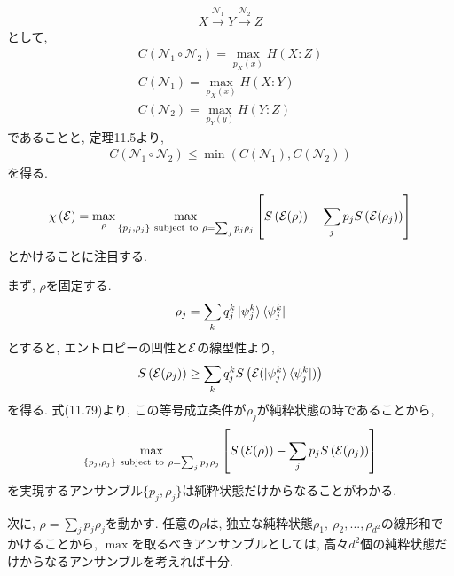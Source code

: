 \begin{ex}
    \label{ex12.10}
    \begin{align*}
        X \xrightarrow{\mathscr{N}_1} Y \xrightarrow{\mathscr{N}_2} Z
    \end{align*}
    として,
    \begin{align*}
        C \left( \mathscr{N}_1 \circ \mathscr{N}_2 \right) = \max_{p_X(x)} H(X:Z) \\
        C \left( \mathscr{N}_1 \right) = \max_{p_X(x)} H(X:Y)                     \\
        C \left( \mathscr{N}_2 \right) = \max_{p_Y(y)} H(Y:Z)
    \end{align*}
    であることと, 定理11.5より,
    \begin{align*}
        C \left( \mathscr{N}_1 \circ \mathscr{N}_2 \right)
        \le \min \left(C \left( \mathscr{N}_1 \right), C \left( \mathscr{N}_2 \right)\right)
    \end{align*}
    を得る.
\end{ex}

\begin{ex}
    \label{ex12.11}
    \begin{align*}
        \chi \left( \mathcal{E} \right) = \max_\rho \max_{\left\{ p_j,
            \rho_j \right\} \mathrm{ \ subject \ to} \ \rho = \sum_j p_j \rho_j }
        \left[ S\left( \mathcal{E}(\rho)\right) - \sum_j p_j S\left( \mathcal{E}(\rho_j) \right) \right]
    \end{align*}
    とかけることに注目する.
    \par
    まず, $\rho$を固定する.
    \begin{align*}
        \rho_j = \sum_k q_j^k \ket{\psi_j^k}\bra{\psi_j^k}
    \end{align*}
    とすると, エントロピーの凹性と$\mathcal{E}$の線型性より,
    \begin{align*}
        S \left( \mathcal{E}(\rho_j)\right) \ge
        \sum_k q_j^k S \left( \mathcal{E}(\ket{\psi_j^k}\bra{\psi_j^k}) \right)
    \end{align*}
    を得る. 式(11.79)より, この等号成立条件が$\rho_j$が純粋状態の時であることから,
    \begin{align*}
        \max_{\left\{ p_j,
            \rho_j \right\} \mathrm{ \ subject \ to} \ \rho = \sum_j p_j \rho_j }
        \left[ S\left( \mathcal{E}(\rho)\right) - \sum_j p_j S\left( \mathcal{E}(\rho_j) \right) \right]
    \end{align*}
    を実現するアンサンブル$\{p_j, \rho_j \}$は純粋状態だけからなることがわかる.
    \par
    次に, $\rho = \sum_j p_j \rho_j$を動かす. 任意の$\rho$は, 独立な純粋状態$\rho_1,\ \rho_2 , ..., \rho_{d^2}$の線形和でかけることから, $\max$を取るべきアンサンブルとしては, 高々$d^2$個の純粋状態だけからなるアンサンブルを考えれば十分.
\end{ex}

